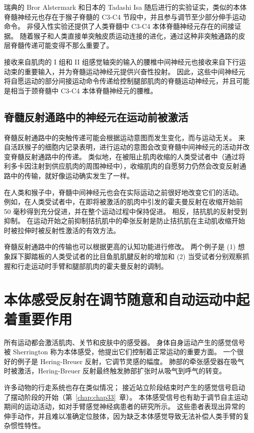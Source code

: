 瑞典的 Bror Alstermark 和日本的 Tadashi Isa 随后进行的实验证实，类似的本体脊髓神经元也存在于猴子脊髓的 C3-C4 节段中，并且参与调节至少部分伸手运动命令。
非侵入性实验还提供了人类脊髓中 C3-C4 本体脊髓神经元存在的间接证据。
随着猴子和人类直接单突触皮质运动连接的进化，通过这种非突触通路的皮层脊髓传递可能变得不那么重要了。


接收来自肌肉的 I 组和 II 组感觉轴突的输入的腰椎中间神经元也接收来自下行运动束的重要输入，并为脊髓运动神经元提供兴奋性投射。
因此，这些中间神经元将自愿运动的部分间接运动命令传递给控制腿部肌肉的脊髓运动神经元，并且可能是相当于颈脊髓中 C3-C4 本体脊髓神经元的腰椎。



\subsection{脊髓反射通路中的神经元在运动前被激活}

脊髓反射通路中的突触传递可能会根据运动意图而发生变化，而与运动无关。
来自活跃猴子的细胞内记录表明，进行运动的意图会改变脊髓中间神经元的活动并改变脊髓反射通路中的传递。
类似地，在被阻止肌肉收缩的人类受试者中（通过将利多卡因注射到供应肌肉的周围神经中），收缩肌肉的自愿努力仍然会改变反射通路中的传输，就好像运动确实发生了一样。


在人类和猴子中，脊髓中间神经元也会在实际运动之前很好地改变它们的活动。
例如，在人类受试者中，在即将被激活的肌肉中引发的霍夫曼反射在收缩开始前 50 毫秒得到充分促进，并在整个运动过程中保持促进。
相反，拮抗肌的反射受到抑制。
在运动开始之前抑制拮抗肌中的牵张反射是防止拮抗肌在主动肌收缩开始时被拉伸时被反射性激活的有效方法。


脊髓反射通路中的传输也可以根据更高的认知功能进行修改。
两个例子是 (1) 想象踩下脚踏板的人类受试者的比目鱼肌肌腱反射的增加和 (2) 当受试者分别观察抓握和行走运动时手臂和腿部肌肉的霍夫曼反射的调制。



\section{本体感受反射在调节随意和自动运动中起着重要作用}

所有运动都会激活肌肉、关节和皮肤中的感受器。
身体自身运动产生的感觉信号被 Sherrington 称为本体感受，他提出它们控制着正常运动的重要方面。
一个很好的例子是 Hering-Breuer 反射，它调节灵感的幅度。 肺部的牵张感受器在吸气时被激活，Hering-Breuer 反射最终触发肺部扩张时从吸气到呼气的转变。


许多动物的行走系统也存在类似情况；
接近站立阶段结束时产生的感觉信号启动了摆动阶段的开始（第~\ref{chap:chap33}~章）。
本体感受信号也有助于调节自主运动期间的运动活动，如对手臂感觉神经病患者的研究所示。
这些患者表现出异常的伸手动作，并且难以准确定位肢体，因为缺乏本体感觉导致无法补偿人类手臂的复杂惯性特性。


